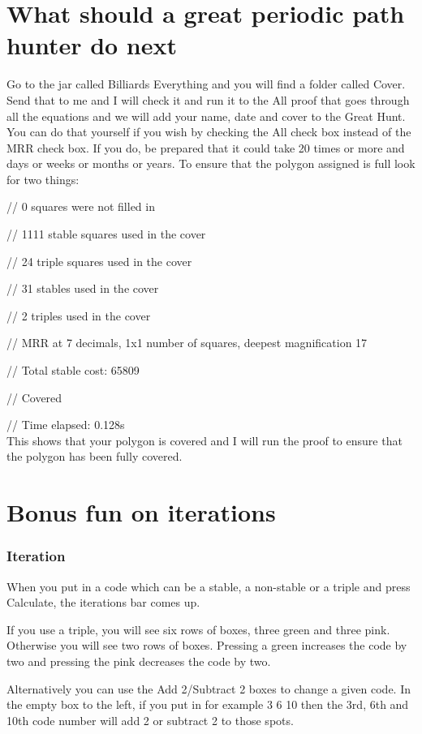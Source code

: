\documentclass[11pt]{report}
\begin{document}
\section{What should a great periodic path hunter do next}
Go to the jar called Billiards Everything and you will find a folder called Cover. Send that to me and I
  will check it and run it to the All proof that goes through all the equations and we will add your name,
  date and cover to the Great Hunt. You can do that yourself if you wish by checking the All check box
  instead of the MRR check box. If you do, be prepared that it could take 20 times or more and days or
  weeks or months or years. To ensure that the polygon assigned is full look for two things:

  // 0 squares were not filled in
  
  // 1111 stable squares used in the cover
  
  // 24 triple squares used in the cover
  
  // 31 stables used in the cover
  
  // 2 triples used in the cover
  
  // MRR at 7 decimals, 1x1 number of squares, deepest magnification 17
  
  // Total stable cost: 65809
  
  // Covered
  
  // Time elapsed: 0.128s \\
This shows that your polygon is covered and I will run the proof to ensure that the polygon has been fully
covered.


\section{Bonus fun on iterations}
\subsubsection{Iteration}
When you put in a code which can be a stable, a non-stable or a triple and press Calculate, the iterations
bar comes up.

If you use a triple, you will see six rows of boxes, three green and three pink. Otherwise you will see two
rows of boxes. Pressing a green increases the code by two and pressing the pink decreases the code by
two.

Alternatively you can use the Add 2/Subtract 2 boxes to change a given code. In the empty box to the left,
if you put in for example 3 6 10 then the 3rd, 6th and 10th code number will add 2 or subtract 2 to those
spots. 
\end{document}
